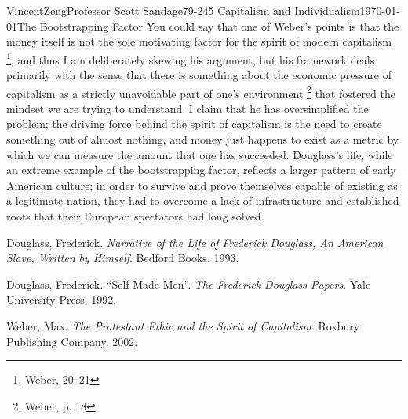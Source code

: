 \documentclass[12pt]{article}
\begin{document}
\begin{mla}{Vincent}{Zeng}{Professor Scott Sandage}{79-245 Capitalism and Individualism}{\today}{The Bootstrapping
Factor}
	You could say that one of Weber's points is that the money itself is
	not the sole motivating factor for the spirit of modern capitalism
	\footnote{Weber, 20--21}, and thus I am deliberately skewing his
	argument, but his framework deals primarily with the sense that there
	is something about the economic pressure of capitalism as a strictly
	unavoidable part of one's environment \footnote{Weber, p. 18} that
	fostered the mindset we are trying to understand. I claim that he has
	oversimplified the problem; the driving force behind the spirit of
	capitalism is the need to create something out of almost nothing, and
	money just happens to exist as a metric by which we can measure the
	amount that one has succeeded. Douglass's life, while an extreme
	example of the bootstrapping factor, reflects a larger pattern of early
	American culture; in order to survive and prove themselves capable of
	existing as a legitimate nation, they had to overcome a lack of
	infrastructure and established roots that their European spectators had
	long solved.

\begin{workscited}

	\bibent
	Douglass, Frederick. \textit{Narrative of the Life of Frederick
	Douglass, An American Slave, Written by Himself}. Bedford Books. 1993.

	\bibent
	Douglass, Frederick. ``Self-Made Men''. \textit{The Frederick Douglass
	Papers}. Yale University Press. 1992.

	\bibent
	Weber, Max. \textit{The Protestant Ethic and the Spirit of Capitalism}.
	Roxbury Publishing Company. 2002.

\end{workscited}
\end{mla}
\end{document}
